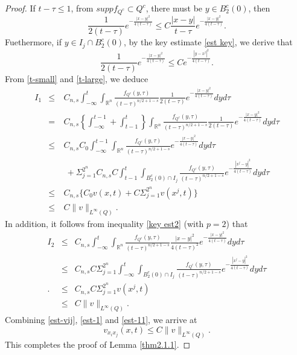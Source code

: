 \documentclass[12pt]{article}
\theoremstyle{remark}
\numberwithin{equation}{section}
\begin{document}
\begin{proof}
If $t-\tau\leq 1$,   from $supp f_{Q^c}\subset Q^c$, there must be $y\in B_2^c(0)$, then
\[\frac{1}{2(t-\tau)}e^{-\frac{|x-y|^2}{4(t-\tau)}}\leq C\frac{|x-y|}{t-\tau}e^{-\frac{|x-y|^2}{4(t-\tau)}}.\]
Fuethermore, if $y\in I_j \cap B_2^c(0)$, by the key estimate \eqref{est key},
we derive that
\begin{equation}\label{t-large}\frac{1}{2(t-\tau)}e^{-\frac{|x-y|^2}{4(t-\tau)}}\leq  Ce^{-\frac{|y-x^j|^2}{4(t-\tau)}}.
\end{equation}
From \eqref{t-small} and \eqref{t-large}, we deduce
 \begin{eqnarray}\label{est-1}
I_1&\leq& C_{n,s}\int_{-\infty}^t \int_{\mathbb{R}^n}  \frac{f_{Q^c}(y,\tau)}{(t-\tau)^{n/2+1-s}} \frac{1}{2(t-\tau)}e^{-\frac{|x-y|^2}{4(t-\tau)}} dy d\tau\nonumber\\
&=&C_{n,s}\left\{\int_{-\infty}^{t-1}+\int_{t-1}^t\right\} \int_{\mathbb{R}^n}  \frac{f_{Q^c}(y,\tau)}{(t-\tau)^{n/2+1-s}} \frac{1}{2(t-\tau)}e^{-\frac{|x-y|^2}{4(t-\tau)}} dy d\tau\nonumber\\
&\leq& C_{n,s}C_0 \int_{-\infty}^{t-1}\int_{\mathbb{R}^n}  \frac{f_{Q^c}(y,\tau)}{(t-\tau)^{n/2+1-s}} e^{-\frac{|x-y|^2}{4(t-\tau)}} dy d\tau\nonumber\\
\ \ &\quad& \ +\Sigma_{j=1}^{2^n}C_{n,s}C\int_{t-1}^t \int_{B_2^c(0)\cap I_j}  \frac{f_{Q^c}(y,\tau)}{(t-\tau)^{n/2+1-s}} e^{-\frac{|x^j-y|^2}{4(t-\tau)}} dy d\tau\nonumber\\
&\leq& C_{n,s}\{C_0 v(x,t)+C\Sigma_{j=1}^{2^n}v(x^j,t)\}\nonumber\\
&\leq& C\|v\|_{L^{\infty}(Q)}.\end{eqnarray}
In addition, it follows from inequality \eqref{key est2} (with $p=2$) that
\begin{eqnarray}\label{est-11}
I_2&\leq& C_{n,s}\int_{-\infty}^t \int_{\mathbb{R}^n}  \frac{f_{Q^c}(y,\tau)}{(t-\tau)^{n/2+1-s}} \frac{|x-y|^2}{4(t-\tau)^2}e^{-\frac{|x-y|^2}{4(t-\tau)}} dy d\tau\nonumber\\
&\leq& C_{n,s}C\Sigma_{j=1}^{2^n}\int_{-\infty}^t \int_{B_2^c(0)\cap I_j}  \frac{f_{Q^c}(y,\tau)}{(t-\tau)^{n/2+1-s}} e^{-\frac{|x^j-y|^2}{4(t-\tau)}} dy d\tau\nonumber\\.
&\leq& C_{n,s}C\Sigma_{j=1}^{2^n}v(x^j,t)\nonumber\\
&\leq& C\|v\|_{L^{\infty}(Q)}.\end{eqnarray}
Combining \eqref{est-vij}, \eqref{est-1} and \eqref{est-11}, we arrive at
\[v_{x_ix_j}(x,t)\leq C\|v\|_{L^{\infty}(Q)}.\]
This completes the proof of Lemma \ref{thm2.1.1}. \end{proof}
\end{document}
